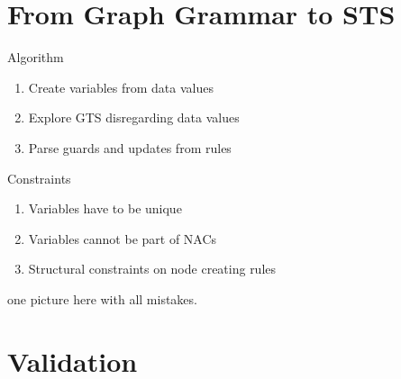\documentclass{FMTslides}
\begin{document}
\section[GG2STS]{From Graph Grammar to STS}

\begin{frame}{Algorithm}
\begin{enumerate}[<+->]
\item Create variables from data values
\item Explore GTS disregarding data values
\item Parse guards and updates from rules
\end{enumerate}
\begin{figure}
\centering
    \hspace{10px}
    \hspace{10px}
    \subfloat[STS]{}
\end{figure}
\end{frame}

\begin{frame}{Constraints}
  \begin{enumerate}[<+->]
    \item Variables have to be unique
    \item Variables cannot be part of NACs
    \item Structural constraints on node creating rules
  \end{enumerate}
  one picture here with all mistakes.
\end{frame}

\section[Validation]{Validation}
\end{document}
